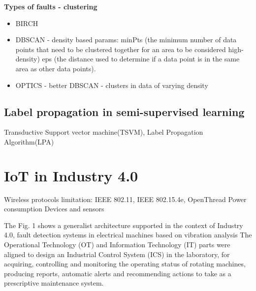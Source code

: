 \textbf{Types of faults - clustering}
\begin{itemize}
\item BIRCH
\item DBSCAN - density based params:
	minPts (the minimum number of data points that need to be clustered together for an area to be considered high-density)
	eps (the distance used to determine if a data point is in the same area as other data points).
\item OPTICS - better DBSCAN -  clusters in data of varying density
\end{itemize}

\subsection{Label propagation in semi-supervised learning}

Transductive Support vector machine(TSVM),
Label Propagation Algorithm(LPA)

\section{IoT in Industry 4.0}
	Wireless protocols limitation: IEEE 802.11, IEEE 802.15.4e, OpenThread
	Power consumption
	Devices and sensors

	The Fig. 1 shows a generalist architecture supported in the context of Industry 4.0, fault detection systems in electrical machines based on vibration analysis  The Operational Technology (OT) and Information Technology (IT) parts were aligned to design an Industrial Control System (ICS) in the laboratory, for acquiring, controlling and monitoring the operating status of rotating machines, producing reports, automatic alerts and recommending actions to take as a prescriptive maintenance system. \cite{torres_automatic_2022}
